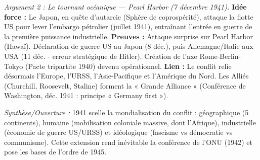 \documentclass[11pt]{article}
\newcommand{\cle}[1]{{\popxbold\color{popdark}#1}}
\begin{document}
\begin{exoresolu}
\textit{Argument 2 : Le tournant océanique — Pearl Harbor (7 décembre 1941).}
\textbf{Idée force :} Le Japon, en quête d'autarcie (\cle{Sphère de coprospérité}), attaque la flotte US pour lever l'embargo pétrolier (juillet 1941), entraînant l'entrée en guerre de la première puissance industrielle.
\textbf{Preuves :} Attaque surprise sur \cle{Pearl Harbor} (Hawaï). Déclaration de guerre US au Japon (8 déc.), puis Allemagne/Italie aux USA (11 déc. - erreur stratégique de Hitler). Création de l'axe \cle{Rome-Berlin-Tokyo} (Pacte tripartite 1940) devenu opérationnel.
\textbf{Lien :} Le conflit relie désormais l'Europe, l'URSS, l'Asie-Pacifique et l'Amérique du Nord. Les \cle{Alliés} (Churchill, Roosevelt, Staline) forment la « \cle{Grande Alliance} » (Conférence de Washington, déc. 1941 : principe « Germany first »).

\textit{Synthèse/Ouverture :} 1941 scelle la \cle{mondialisation} du conflit : géographique (5 continents), humaine (mobilisation coloniale massive, dont l'Afrique), industrielle (économie de guerre US/URSS) et idéologique (fascisme vs démocratie vs communisme). Cette extension rend inévitable la \cle{conférence de l'ONU} (1942) et pose les bases de l'ordre de 1945.
\end{exoresolu}
\end{document}
